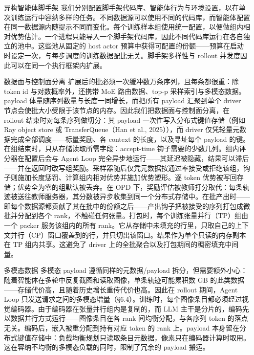 异构智能体脚手架 我们分别配置脚手架代码库、智能体行为与环境设置，以在单次训练运行中容纳多样的任务。不同数据源可以使用不同的代码库，而智能体配置在同一数据源内随提示不同而变化。每个训练样本组使用统一配置，以便做组内相对优势估计。一个进程只能导入一个脚手架代码库，因此不同代码库运行在各自独立的池中。这些池从固定的 host actor 预算中获得可配置的份额——预算在启动时设定一次，与每步调度的训练数据配比无关。脚手架多样性与 rollout 并发度因此可以在同一个执行框架内扩展。

数据面与控制面分离 扩展后的批必须一次缓冲数万条序列，且每条都很重：除 token id 与对数概率外，还携带 MoE 路由数据、top-p 采样索引与多模态数据。payload 体量随序列数量与长度一同增长，而把所有 payload 汇聚到单个 driver 节点会使批大小受限于该节点的内存。因此我们把数据面与控制面分离，在 rollout 结束时对每条序列做切分：其 payload 一次性写入分布式键值存储（例如 Ray object store 或 TransferQueue（Han et al., 2025）），而 driver 仅凭轻量元数据完成全部调度——标量奖励、各 context 的长度，以及寻址每个 payload 的键。在组结束时，只从存储读取所需字段：accept-time 钩子需要的少数几列。组内评分器在配置后会与 Agent Loop 完全异步地运行——其延迟被隐藏，结果可以滞后——并在返回时改写组奖励。采样器随后仅凭元数据按通过率接受或拒绝该组，钩子则施加长度惩罚、计算组内相对优势并施加优势塑形。逐 token 优势被写回存储；优势全为零的组默认被丢弃。在 OPD 下，奖励评估被教师打分取代：每条轨迹被送往教师服务器，其分数被异步收集到同一个分布式存储中。在批产出时——即每个数据源都贡献了其在批中的份额之后——产出钩子把被接受的序列打包成微批并分配到各个 rank，不触碰任何张量。打包时，每个训练张量并行（TP）组由一个 packer 服务该组内的所有 rank。它从存储中未填充的行里，只取自己的上下文并行（CP）窗口覆盖到的行，并只切出该窗口。结果作为单个只读的内存副本在 TP 组内共享。这避免了 driver 上的全批聚合以及打包期间的稠密填充中间量。



多模态数据 多模态 payload 遵循同样的元数据/payload 拆分，但需要额外小心：随着智能体在多轮中反复截图和读取图像，单条轨迹可能累积数 GB 的此类数据——存储代价高，且随着历史增长重传代价也高。因此在 rollout 期间，Agent Loop 只发送请求之间的多模态增量（§6.4）。训练时，每个图像条目都必须经过视觉编码器。由于编码器在张量并行组内是复制的，而 LLM 主干是分片的，编码先以数据并行方式运行——图像条目在各 rank 间均衡分配，与各序列 token 的落点无关。编码后，嵌入被重分配到持有对应 token 的 rank 上。payload 本身留在分布式键值存储中：负载均衡规划只读取条目元数据，像素只在编码器计算时取用。这在容纳不均衡的多模态负载的同时，限制了冗余的 payload 搬运。
